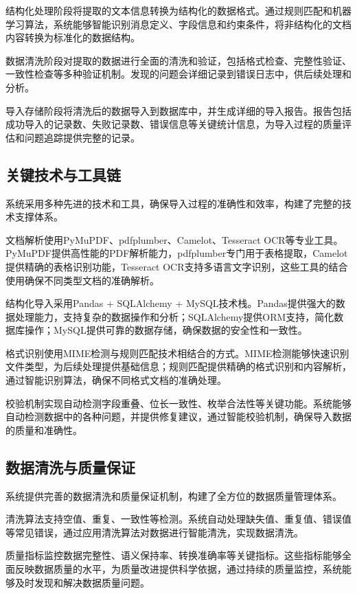 结构化处理阶段将提取的文本信息转换为结构化的数据格式。通过规则匹配和机器学习算法，系统能够智能识别消息定义、字段信息和约束条件，将非结构化的文档内容转换为标准化的数据结构。

数据清洗阶段对提取的数据进行全面的清洗和验证，包括格式检查、完整性验证、一致性检查等多种验证机制。发现的问题会详细记录到错误日志中，供后续处理和分析。

导入存储阶段将清洗后的数据导入到数据库中，并生成详细的导入报告。报告包括成功导入的记录数、失败记录数、错误信息等关键统计信息，为导入过程的质量评估和问题追踪提供完整的记录。

\subsection{关键技术与工具链}

系统采用多种先进的技术和工具，确保导入过程的准确性和效率，构建了完整的技术支撑体系。

文档解析使用PyMuPDF、pdfplumber、Camelot、Tesseract OCR等专业工具。PyMuPDF提供高性能的PDF解析能力，pdfplumber专门用于表格提取，Camelot提供精确的表格识别功能，Tesseract OCR支持多语言文字识别，这些工具的结合使用确保不同类型文档的准确解析。

结构化导入采用Pandas + SQLAlchemy + MySQL技术栈。Pandas提供强大的数据处理能力，支持复杂的数据操作和分析；SQLAlchemy提供ORM支持，简化数据库操作；MySQL提供可靠的数据存储，确保数据的安全性和一致性。

格式识别使用MIME检测与规则匹配技术相结合的方式。MIME检测能够快速识别文件类型，为后续处理提供基础信息；规则匹配提供精确的格式识别和内容解析，通过智能识别算法，确保不同格式文档的准确处理。

校验机制实现自动检测字段重叠、位长一致性、枚举合法性等关键功能。系统能够自动检测数据中的各种问题，并提供修复建议，通过智能校验机制，确保导入数据的质量和准确性。


\subsection{数据清洗与质量保证}

系统提供完善的数据清洗和质量保证机制，构建了全方位的数据质量管理体系。

清洗算法支持空值、重复、一致性等检测。系统自动处理缺失值、重复值、错误值等常见错误，通过应用清洗算法对数据进行智能清洗，实现数据清洗。

质量指标监控数据完整性、语义保持率、转换准确率等关键指标。这些指标能够全面反映数据质量的水平，为质量改进提供科学依据，通过持续的质量监控，系统能够及时发现和解决数据质量问题。

